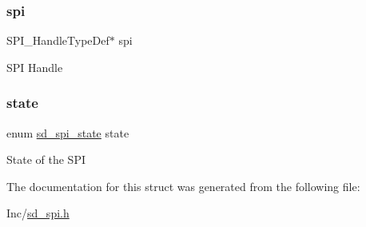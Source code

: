 \subsubsection{\texorpdfstring{spi}{spi}}
{\footnotesize\ttfamily S\+P\+I\+\_\+\+Handle\+Type\+Def$\ast$ spi}

S\+PI Handle \mbox{\label{structsd__spi__dev_aa9221437053c4de17edc36917e4afda2}} 
\subsubsection{\texorpdfstring{state}{state}}
{\footnotesize\ttfamily enum \mbox{\hyperlink{group___s_d___s_p_i___types_gaf0ec45d302a4c5a4af552acb7a001fa1}{sd\+\_\+spi\+\_\+state}} state}

State of the S\+PI 

The documentation for this struct was generated from the following file\+:\begin{DoxyCompactItemize}
\item 
Inc/\mbox{\hyperlink{sd__spi_8h}{sd\+\_\+spi.\+h}}\end{DoxyCompactItemize}
